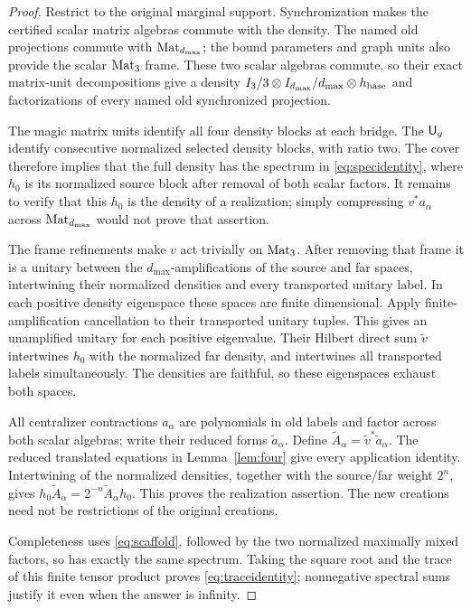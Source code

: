 \begin{proof}
Restrict to the original marginal support. Synchronization makes the certified scalar matrix algebras commute with the density. The named old projections commute with $\mathrm{Mat}_{d_{\max}}$; the bound parameters and graph units also provide the scalar $\mathrm{Mat}_3$ frame. These two scalar algebras commute, so their exact matrix-unit decompositions give a density $I_3/3\otimes I_{d_{\max}}/d_{\max}\otimes h_{\rm base}$ and factorizations of every named old synchronized projection.

The magic matrix units identify all four density blocks at each bridge. The $\mathsf U_g$ identify consecutive normalized selected density blocks, with ratio two. The cover therefore implies that the full density has the spectrum in \eqref{eq:specidentity}, where $h_0$ is its normalized source block after removal of both scalar factors. It remains to verify that this $h_0$ is the density of a realization; simply compressing $v^*a_\alpha$ across $\mathrm{Mat}_{d_{\max}}$ would not prove that assertion.

The frame refinements make $v$ act trivially on $\mathrm{Mat}_3$. After removing that frame it is a unitary between the $d_{\max}$-amplifications of the source and far spaces, intertwining their normalized densities and every transported unitary label. In each positive density eigenspace these spaces are finite dimensional. Apply finite-amplification cancellation to their transported unitary tuples. This gives an unamplified unitary for each positive eigenvalue. Their Hilbert direct sum $\widetilde v$ intertwines $h_0$ with the normalized far density, and intertwines all transported labels simultaneously. The densities are faithful, so these eigenspaces exhaust both spaces.

All centralizer contractions $a_\alpha$ are polynomials in old labels and factor across both scalar algebras; write their reduced forms $\widetilde a_\alpha$. Define $\widetilde A_\alpha=\widetilde v^*\widetilde a_\alpha$. The reduced translated equations in Lemma~\ref{lem:four} give every application identity. Intertwining of the normalized densities, together with the source/far weight $2^n$, gives $h_0\widetilde A_\alpha=2^{-n}\widetilde A_\alpha h_0$. This proves the realization assertion. The new creations need not be restrictions of the original creations.

Completeness uses \eqref{eq:scaffold}, followed by the two normalized maximally mixed factors, so has exactly the same spectrum. Taking the square root and the trace of this finite tensor product proves \eqref{eq:traceidentity}; nonnegative spectral sums justify it even when the answer is infinity.
\end{proof}

